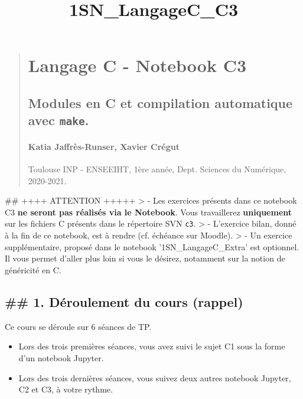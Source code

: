 \documentclass[11pt]{article}
\title{1SN\_LangageC\_C3}
\providecommand{\tightlist}{%
      \setlength{\itemsep}{0pt}\setlength{\parskip}{0pt}}
\begin{document}
    
    
    \maketitle
    
    

    
    \begin{quote}
\section{Langage C - Notebook C3}\label{langage-c---notebook-c3}

\subsection{\texorpdfstring{Modules en C et compilation automatique avec
\texttt{make}.}{Modules en C et compilation automatique avec make.}}\label{modules-en-c-et-compilation-automatique-avec-make.}

\mbox{}%
\paragraph{Katia Jaffrès-Runser, Xavier
Crégut}\label{katia-jaffruxe8s-runser-xavier-cruxe9gut}

Toulouse INP - ENSEEIHT, 1ère année, Dept. Sciences du Numérique,
2020-2021.
\end{quote}

    \#\# ++++ ATTENTION +++++ \textgreater{} - Les exercices présents dans
ce notebook C3 \textbf{ne seront pas réalisés via le Notebook}. Vous
travaillerez \textbf{uniquement} sur les fichiers C présents dans le
répertoire SVN \texttt{c3}. \textgreater{} - L'exercice bilan, donné à
la fin de ce notebook, est à rendre (cf. échéance sur Moodle).
\textgreater{} - Un exercice supplémentaire, proposé dans le notebook
'1SN\_LangageC\_Extra' est optionnel. Il vous permet d'aller plus loin
si vous le désirez, notamment sur la notion de généricité en C.

    \subsection{\#\# 1. Déroulement du cours
(rappel)}\label{duxe9roulement-du-cours-rappel}

Ce cours se déroule sur 6 séances de TP.

\begin{itemize}
\tightlist
\item
  Lors des trois premières séances, vous avez suivi le sujet C1 sous la
  forme d'un notebook Jupyter.
\item
  Lors des trois dernières séances, vous suivez deux autres notebook
  Jupyter, C2 et C3, à votre rythme.
\end{itemize}
\end{document}
